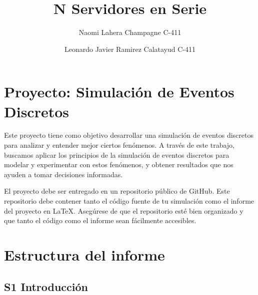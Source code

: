 \documentclass[
]{article}
\title{N Servidores en Serie}
\author{ Naomi Lahera Champagne C-411 \and Leonardo Javier Ramirez Calatayud C-411}
\date{}
\begin{document}
\maketitle

\hypertarget{proyecto-simulaciuxf3n-de-eventos-discretos}{%
\section{Proyecto: Simulación de Eventos
Discretos}\label{proyecto-simulaciuxf3n-de-eventos-discretos}}

Este proyecto tiene como objetivo desarrollar una simulación de eventos
discretos para analizar y entender mejor ciertos fenómenos. A través de
este trabajo, buscamos aplicar los principios de la simulación de
eventos discretos para modelar y experimentar con estos fenómenos, y
obtener resultados que nos ayuden a tomar decisiones informadas.

El proyecto debe ser entregado en un repositorio público de GitHub. Este
repositorio debe contener tanto el código fuente de tu simulación como
el informe del proyecto en LaTeX. Asegúrese de que el repositorio esté
bien organizado y que tanto el código como el informe sean fácilmente
accesibles.

\hypertarget{estructura-del-informe}{%
\section{Estructura del informe}\label{estructura-del-informe}}

\hypertarget{s1-introducciuxf3n}{%
\subsection{S1 Introducción}\label{s1-introducciuxf3n}}
\end{document}
